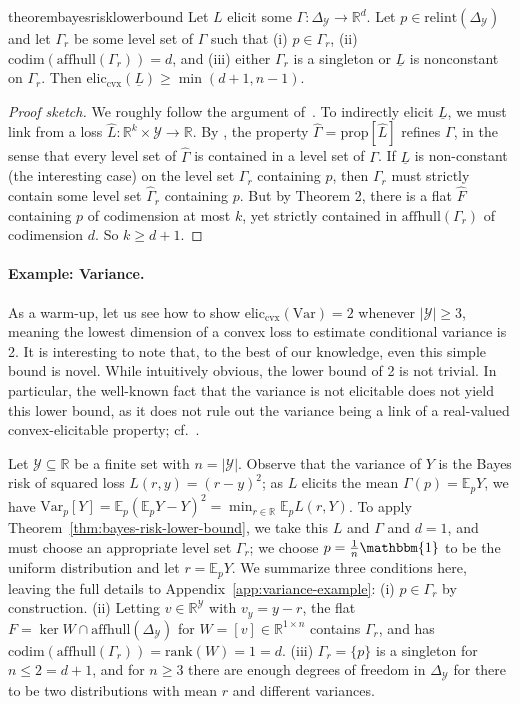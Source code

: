 \documentclass{article}
\newcommand{\reals}{\mathbb{R}}
\newcommand{\simplex}{\Delta_\Y}
\newcommand{\relint}[1]{\mathrm{relint}(#1)}
\newcommand{\prop}[1]{\mathrm{prop}[#1]}
\newcommand{\eliccvx}{\mathrm{elic}_\mathrm{cvx}}
\newcommand{\codim}{\mathrm{codim}}
\newcommand{\rank}{\mathrm{rank}}
\newcommand{\affhull}{\mathrm{affhull}}
\newcommand{\E}{\mathbb{E}}
\newcommand{\Y}{\mathcal{Y}}
\newcommand{\lbar}{\underline{L}} %
\newcommand{\Var}{\mathrm{Var}}
\newcommand{\ones}{\mathbbm{1}}
\begin{document}
\begin{restatable}{theorem}{bayesrisklowerbound}\label{thm:bayes-risk-lower-bound}
  Let $L$ elicit some $\Gamma:\simplex\to\reals^d$.
  Let $p\in\relint\simplex$ and let $\Gamma_r$ be some level set of $\Gamma$ such that
  (i) $p\in\Gamma_r$,
  (ii) $\codim(\affhull(\Gamma_r))=d$, and
  (iii) either $\Gamma_r$ is a singleton or $\lbar$ is nonconstant on $\Gamma_r$.
  Then $\eliccvx(\lbar) \geq \min(d+1,n-1)$.
\end{restatable}

\begin{proof}[Proof sketch]
  We roughly follow the argument of~\citet[Corollary 7]{frongillo2018elicitation}.
  To indirectly elicit $\lbar$, we must link from a loss $\hat L: \reals^k \times \Y \to \reals$.
  By \citet[Theorem 4]{frongillo2018elicitation}, the property $\hat\Gamma = \prop{\hat L}$ refines $\Gamma$, in the sense that every level set of $\hat\Gamma$ is contained in a level set of $\Gamma$.
  If $\lbar$ is non-constant (the interesting case) on the level set $\Gamma_r$ containing $p$, then $\Gamma_r$ must strictly contain some level set $\hat \Gamma_{\hat r}$ containing $p$.
  But by Theorem 2, there is a flat $\hat{F}$ containing $p$ of codimension at most $k$, yet strictly contained in $\affhull(\Gamma_r)$ of codimension $d$.
  So $k \geq d + 1$.
\end{proof}


\paragraph{Example: Variance.}
As a warm-up, let us see how to show $\eliccvx(\Var)=2$ whenever $|\Y|\geq 3$, meaning the lowest dimension of a convex loss to estimate conditional variance is 2.
It is interesting to note that, to the best of our knowledge, even this simple bound is novel.
While intuitively obvious, the lower bound of 2 is not trivial.
In particular, the well-known fact that the variance is not elicitable does not yield this lower bound, as it does not rule out the variance being a link of a real-valued convex-elicitable property; cf.~\citet[Remark 1]{frongillo2018elicitation}.

Let $\Y\subseteq\reals$ be a finite set with $n=|\Y|$.
Observe that the variance of $Y$ is the Bayes risk of squared loss $L(r,y) = (r-y)^2$; as $L$ elicits the mean $\Gamma(p) = \E_p Y$, we have $\Var_p[Y] = \E_p (\E_pY - Y)^2 = \min_{r\in\reals} \E_p L(r,Y)$.
To apply Theorem~\ref{thm:bayes-risk-lower-bound}, we take this $L$ and $\Gamma$ and $d=1$, and must choose an appropriate level set $\Gamma_r$; we choose $p = \tfrac 1 n \ones$ to be the uniform distribution and let $r=\E_pY$.
We summarize three conditions here, leaving the full details to Appendix~\ref{app:variance-example}:
(i) $p\in\Gamma_r$ by construction.
(ii) Letting $v\in\reals^\Y$ with $v_y = y - r$, the flat $F = \ker W \cap \affhull(\simplex)$ for $W = [v]\in\reals^{1\times n}$ contains $\Gamma_r$, and has $\codim(\affhull(\Gamma_r)) = \rank(W) = 1 = d$.
(iii)
$\Gamma_r=\{p\}$ is a singleton for $n \leq 2 = d+1$, and for $n\geq 3$ there are enough degrees of freedom in $\simplex$ for there to be two distributions with mean $r$ and different variances.
\end{document}
